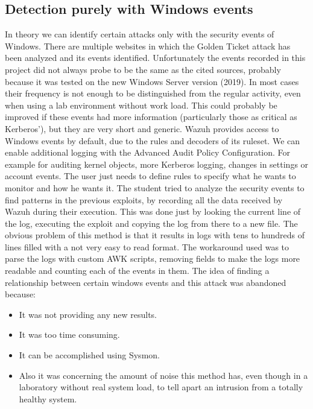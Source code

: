 \subsection{Detection purely with Windows events}
In theory we can identify certain attacks only with the security events of Windows. There are multiple websites in which the Golden Ticket attack has been analyzed and its events identified\cite{events_1}\cite{detection_events}.
\linej
Unfortunately the events recorded in this project did not always probe to be the same as the cited sources, probably because it was tested on the new Windows Server version (2019).
In most cases their frequency is not enough to be distinguished from the regular activity, even when using a lab environment without work load.
This could probably be improved if these events had more information (particularly those as critical as Kerberos'), but they are very short and generic.
\linej
\linej
Wazuh provides access to Windows events by default, due to the rules and decoders of its ruleset\cite{wazuh_ossec_ruleset}.
We can enable additional logging with the Advanced Audit Policy Configuration. For example for auditing kernel objects, more Kerberos logging, changes in settings or account events.
The user just needs to define rules to specify what he wants to monitor and how he wants it.
\linej
\linej
The student tried to analyze the security events to find patterns in the previous exploits, by recording all the data received by Wazuh during their execution. This was done just by looking the current line of the log, executing the exploit and copying the log from there to a new file.
\linej
The obvious problem of this method is that it results in logs with tens to hundreds of lines filled with a not very easy to read format. The workaround used was to parse the logs with custom AWK scripts\cite{memoria_github}, removing fields to make the logs more readable and counting each of the events in them.
\linej
\linej
The idea of finding a relationship between certain windows events and this attack was abandoned because:
\begin{itemize}
	\item It was not providing any new results.
	\item It was too time consuming.
	\item It can be accomplished using Sysmon\cite{sysmon}\cite{sysmon_event_7_mimikatz}.
	\item Also it was concerning the amount of noise this method has, even though in a laboratory without real system load, to tell apart an intrusion from a totally healthy system.
\end{itemize}
